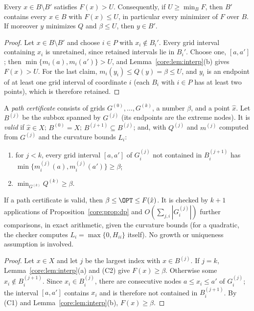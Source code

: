\begin{proposition}\label{core:prop:filter}
Every $x\in B\setminus B'$ satisfies $F(x)>U$. Consequently, if
$U\ge\min_BF$, then $B'$ contains every $x\in B$ with $F(x)\le U$, in
particular every minimizer of $F$ over $B$. If moreover $y$ minimizes $Q$ and
$\beta\le U$, then $y\in B'$.
\end{proposition}

\begin{proof}
Let $x\in B\setminus B'$ and choose $i\in P$ with $x_i\notin B_i'$. Every grid
interval containing $x_i$ is unretained, since retained intervals lie in
$B_i'$. Choose one, $[a,a']$; then $\min\{m_i(a),m_i(a')\}>U$, and
Lemma~\ref{core:lem:interp}(b) gives $F(x)>U$. For the last claim,
$m_i(y_i)\le Q(y)=\beta\le U$, and $y_i$ is an endpoint of at least one grid
interval of coordinate $i$ (each $B_i$ with $i\in P$ has at least two points),
which is therefore retained.
\end{proof}

\begin{definition}\label{core:def:cert}
A \emph{path certificate} consists of grids $G^{(0)},\dots,G^{(k)}$, a number
$\beta$, and a point $\hat x$. Let $B^{(j)}$ be the subbox spanned by
$G^{(j)}$ (its endpoints are the extreme nodes). It is \emph{valid} if
$\hat x\in X$; $B^{(0)}=X$; $B^{(j+1)}\subseteq B^{(j)}$; and, with $Q^{(j)}$
and $m^{(j)}$ computed from $G^{(j)}$ and the curvature bounds $L_i$:
\begin{enumerate}
\item[(C1)] for $j<k$, every grid interval $[a,a']$ of $G_i^{(j)}$ not
contained in $B_i^{(j+1)}$ has $\min\{m_i^{(j)}(a),m_i^{(j)}(a')\}\ge\beta$;
\item[(C2)] $\min_{G^{(k)}}Q^{(k)}\ge\beta$.
\end{enumerate}
\end{definition}

\begin{theorem}\label{core:thm:cert}
If a path certificate is valid, then $\beta\le\OPT\le F(\hat x)$. It is
checked by $k+1$ applications of Proposition~\ref{core:prop:dp} and
$O(\sum_{j,i}|G_i^{(j)}|)$ further comparisons, in exact arithmetic, given
the curvature bounds (for a quadratic, the checker computes
$L_i=\max\{0,H_{ii}\}$ itself). No growth or uniqueness assumption is
involved.
\end{theorem}

\begin{proof}
Let $x\in X$ and let $j$ be the largest index with $x\in B^{(j)}$. If $j=k$,
Lemma~\ref{core:lem:interp}(a) and (C2) give $F(x)\ge\beta$. Otherwise some
$x_i\notin B_i^{(j+1)}$. Since $x_i\in B_i^{(j)}$, there are consecutive nodes
$a\le x_i\le a'$ of $G_i^{(j)}$; the interval $[a,a']$ contains $x_i$ and is
therefore not contained in $B_i^{(j+1)}$. By (C1) and
Lemma~\ref{core:lem:interp}(b), $F(x)\ge\beta$.
\end{proof}

